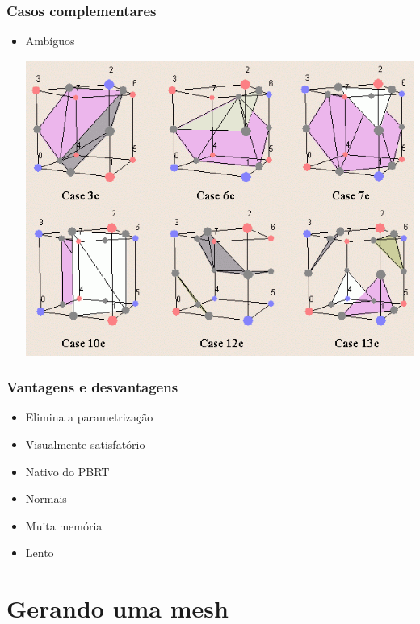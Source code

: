 \documentclass[brazil]{beamer}
\begin{document}
    \begin{frame}
      \frametitle{Casos complementares}
        \begin{itemize}
          \item Ambíguos
            \begin{center}
              \includegraphics[width=.6\textwidth]{imgs/ambiguous-cases.png}
            \end{center}
        \end{itemize}
    \end{frame}        

    \begin{frame}
      \frametitle{Vantagens e desvantagens}
        \begin{itemize}
          \item Elimina a parametrização
          \item Visualmente satisfatório
          \item Nativo do PBRT
          \item Normais
          \item Muita memória
          \item Lento
        \end{itemize}
    \end{frame}        

  \section{Gerando uma mesh}
  
    \subsection{}
    
\end{document}
